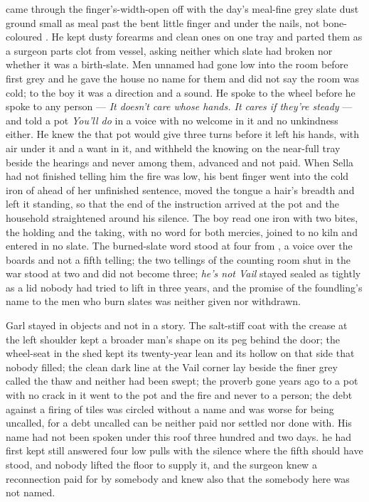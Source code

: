  came through the finger's-width-open  off  with the day's meal-fine grey slate dust ground small as meal past the bent little finger and under the nails, not bone-coloured . He kept dusty forearms and clean ones on one tray and parted them as a surgeon parts clot from vessel, asking neither which slate had broken nor whether it was a birth-slate. Men unnamed had gone low into the room before first grey and he gave the house no name for them and did not say the room was cold; to the boy it was a direction and a sound. He spoke to the wheel before he spoke to any person --- \emph{It doesn't care whose hands. It cares if they're steady} --- and told a pot \emph{You'll do} in a voice with no welcome in it and no unkindness either. He knew the  that pot would give three turns before it left his hands, with air under it and a want in it, and withheld the knowing on the near-full tray beside the hearings and never among them, advanced and not paid. When Sella had not finished telling him the fire was low, his bent finger went into the cold iron of  ahead of her unfinished sentence, moved the tongue a hair's breadth and left it standing, so that the end of the instruction arrived at the pot and the household straightened around his silence. The boy read one iron with two bites, the holding and the taking, with no  word for both mercies, joined to no kiln and entered in no slate. The burned-slate word stood at four from , a voice over the boards and not a fifth telling; the two tellings of the counting room shut in the war stood at two and did not become three; \emph{he's not Vail} stayed sealed as tightly as a lid nobody had tried to lift in three years, and the promise of the foundling's name to the men who burn slates was neither given nor withdrawn.

Garl stayed in objects and not in a story. The salt-stiff coat with the crease at the left shoulder kept a broader man's shape on its peg behind the door; the wheel-seat in the shed kept its twenty-year lean and its hollow on that side that nobody filled; the clean dark line at the Vail corner lay beside the finer grey called the thaw and neither had been swept; the proverb gone years ago to a pot with no crack in it went to the pot and the fire and never to a person; the debt against a firing of tiles was circled without a name and was worse for being uncalled, for a debt uncalled can be neither paid nor settled nor done with. His name had not been spoken under this roof three hundred and two days.  he had first kept still answered four low pulls with the silence where the fifth should have stood, and nobody lifted the floor to supply it, and the surgeon knew a reconnection paid for by somebody and knew also that the somebody here was not named.

